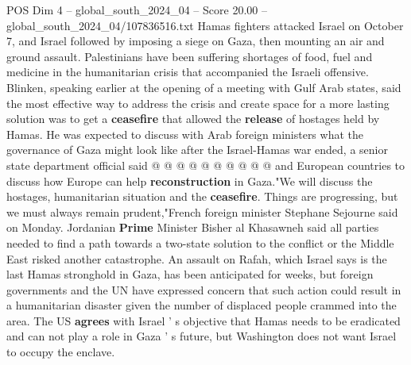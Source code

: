 \begin{textsample}{POS Dim 4 – global\_south\_2024\_04 – Score 20.00 – global\_south\_2024\_04/107836516.txt}
Hamas fighters attacked Israel on October 7, and Israel followed by imposing a siege on Gaza, then mounting an air and ground assault.
Palestinians have been suffering shortages of food, fuel and medicine in the humanitarian crisis that accompanied the Israeli offensive.
Blinken, speaking earlier at the opening of a meeting with Gulf Arab states, said the most effective way to address the crisis and create space for a more lasting solution was to get a \textbf{ceasefire} that allowed the \textbf{release} of hostages held by Hamas.
He was expected to discuss with Arab foreign ministers what the governance of Gaza might look like after the Israel-Hamas war ended, a senior state department official said @ @ @ @ @ @ @ @ @ @ and European countries to discuss how Europe can help \textbf{reconstruction} in Gaza."We will discuss the hostages, humanitarian situation and the \textbf{ceasefire}.
Things are progressing, but we must always remain prudent,"French foreign minister Stephane Sejourne said on Monday.
Jordanian \textbf{Prime} Minister Bisher al Khasawneh said all parties needed to find a path towards a two-state solution to the conflict or the Middle East risked another catastrophe.
An assault on Rafah, which Israel says is the last Hamas stronghold in Gaza, has been anticipated for weeks, but foreign governments and the UN have expressed concern that such action could result in a humanitarian disaster given the number of displaced people crammed into the area.
The US \textbf{agrees} with Israel ' s objective that Hamas needs to be eradicated and can not play a role in Gaza ' s future, but Washington does not want Israel to occupy the enclave.

\end{textsample}
